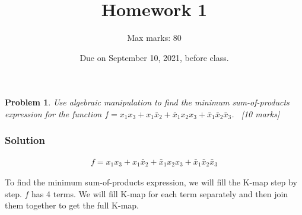 \documentclass[twocolumn]{article}
\title{Homework 1}
\author{Max marks: 80}
\date{Due on September 10, 2021, before class.}
\newtheorem{prob}{Problem}
\newcommand{\bx}{\bar{x}}
\begin{document}
\maketitle

\begin{prob}
Use algebraic manipulation to find the minimum sum-of-products expression for the function $f = x_1x_3 + x_1\bx_2 + \bx_1 x_2 x_3 + \bx_1 \bx_2 \bx_3$. ~\cite[Prob 2.12]{brown2013fundamentals}[10 marks]
\end{prob}

\subsubsection*{Solution}
\begin{align}
f = x_1x_3 + x_1\bx_2 + \bx_1 x_2 x_3 + \bx_1 \bx_2 \bx_3
  \label{eq:1-src}
\end{align}

To find the minimum sum-of-products expression, we will fill the K-map step by step. $f$ has 4
terms. We will fill K-map for each term separately and then join them together
to get the full K-map.  
\end{document}
